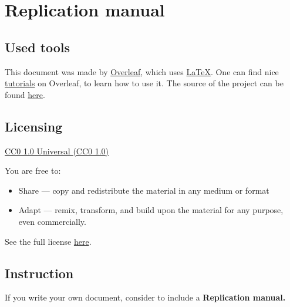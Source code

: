 \documentclass{article}
\begin{document}
\section{Replication manual}

\subsection{Used tools}

This document was made by \href{https://www.overleaf.com/}{Overleaf}, which uses \href{https://en.wikipedia.org/wiki/LaTeX}{LaTeX}.
One can find nice \href{https://www.overleaf.com/learn/latex/Tutorials}{tutorials} on Overleaf, to learn how to use it. The source of the project can be found \href{https://www.overleaf.com/read/vjhvckyttxxx}{here}.

\subsection{Licensing}

\href{https://creativecommons.org/publicdomain/zero/1.0/}{CC0 1.0 Universal (CC0 1.0)}

You are free to:
\begin{itemize}
    \item Share — copy and redistribute the material in any medium or format
    \item Adapt — remix, transform, and build upon the material
    for any purpose, even commercially.
\end{itemize}

See the full license \href{https://creativecommons.org/publicdomain/zero/1.0/legalcode}{here}.

\subsection{Instruction}

If you write your own document, consider to include a \bf{Replication manual}.

\newpage

\tableofcontents \label{sec:toc}
\end{document}
